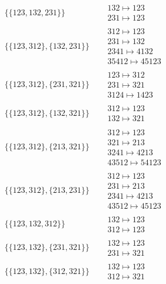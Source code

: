 \begin{tiny}
\begin{align}
\{\{123, 132, 231\}\}
\quad
&
\begin{matrix}
132 \mapsto 123\\231 \mapsto 123
\end{matrix}
\\
\{\{123, 312\}, \{132, 231\}\}
\quad
&
\begin{matrix}
312 \mapsto 123\\231 \mapsto 132\\2341 \mapsto 4132\\35412 \mapsto 45123
\end{matrix}
\\
\{\{123, 312\}, \{231, 321\}\}
\quad
&
\begin{matrix}
123 \mapsto 312\\231 \mapsto 321\\3124 \mapsto 1423
\end{matrix}
\\
\{\{123, 312\}, \{132, 321\}\}
\quad
&
\begin{matrix}
312 \mapsto 123\\132 \mapsto 321
\end{matrix}
\\
\{\{123, 312\}, \{213, 321\}\}
\quad
&
\begin{matrix}
312 \mapsto 123\\321 \mapsto 213\\3241 \mapsto 4213\\43512 \mapsto 54123
\end{matrix}
\\
\{\{123, 312\}, \{213, 231\}\}
\quad
&
\begin{matrix}
312 \mapsto 123\\231 \mapsto 213\\2341 \mapsto 4213\\43512 \mapsto 45123
\end{matrix}
\\
\{\{123, 132, 312\}\}
\quad
&
\begin{matrix}
132 \mapsto 123\\312 \mapsto 123
\end{matrix}
\\
\{\{123, 132\}, \{231, 321\}\}
\quad
&
\begin{matrix}
132 \mapsto 123\\231 \mapsto 321
\end{matrix}
\\
\{\{123, 132\}, \{312, 321\}\}
\quad
&
\begin{matrix}
132 \mapsto 123\\312 \mapsto 321

\end{matrix}
\end{align}
\end{tiny}
